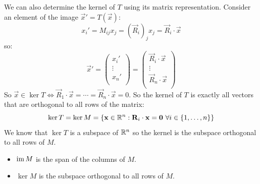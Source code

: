 \documentclass[../main.tex]{subfiles}
\begin{document}
We can also determine the kernel of $T$ using its matrix representation.
Consider an element of the image $\vec{x}' = T(\vec{x})$:
\[
  x_i' = M_{i j}x_j = (\vec{R}_i)_j x_j = \vec{R}_i \cdot \vec{x}
\]
so:
\[
  \vec{x}' = \begin{pmatrix}
  x_i' \\
  \vdots \\
  x_n' \\
  \end{pmatrix}
  =
  \begin{pmatrix}
  \vec{R}_i \cdot \vec{x} \\
  \vdots \\
  \vec{R}_n \cdot \vec{x} \\
  \end{pmatrix}
\]
So $\vec{x} \in \ker T \iff \vec{R}_1 \cdot \vec{x} = \cdots = \vec{R}_n \cdot \vec{x} = 0$.
So the kernel of $T$ is exactly all vectors that are orthogonal to all rows of the matrix:
\[
  \ker T = \ker M = \{\mathbf{\bm{x}} \in \mathbb{R}^{n}: \mathbf{\bm{R}}_i \cdot \mathbf{\bm{x}} = \mathbf{\bm{0}}\ \forall i \in \{1, \ldots, n\}\}
\]
We know that $\ker T$ is a subspace of $\mathbb{R}^{n}$ so the kernel is the subspace orthogonal to all rows of $M$.
\begin{remark}[Summary]
  \begin{itemize}
    \item $\operatorname{im} M$ is the span of the columns of $M$.
    \item $\ker M$ is the subspace orthogonal to all rows of $M$.
  \end{itemize}
\end{remark}
\end{document}
